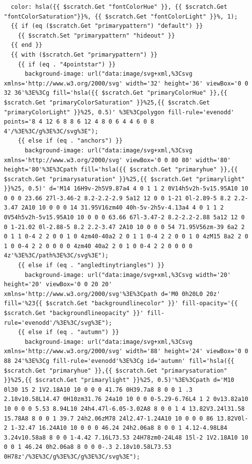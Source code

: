 \documentclass[11pt]{article}
\begin{document}
\begin{enumerate}
\begin{verbatim}
  color: hsla({{ $scratch.Get "fontColorHue" }}, {{ $scratch.Get "fontColorSaturation"}}%, {{ $scratch.Get "fontColorLight" }}%, 1);
  {{ if (eq ($scratch.Get "primarypattern") "default") }}
    {{ $scratch.Set "primarypattern" "hideout" }}
  {{ end }}
  {{ with ($scratch.Get "primarypattern") }}
    {{ if (eq . "4pointstar") }}
      background-image: url("data:image/svg+xml,%3Csvg xmlns='http://www.w3.org/2000/svg' width='32' height='36' viewBox='0 0 32 36'%3E%3Cg fill='hsla({{ $scratch.Get "primaryColorHue" }},{{ $scratch.Get "primaryColorSaturation" }}%25,{{ $scratch.Get "primaryColorLight" }}%25, 0.5)' %3E%3Cpolygon fill-rule='evenodd' points='8 4 12 6 8 8 6 12 4 8 0 6 4 4 6 0 8 4'/%3E%3C/g%3E%3C/svg%3E");
    {{ else if (eq . "anchors") }}
      background-image: url("data:image/svg+xml,%3Csvg xmlns='http://www.w3.org/2000/svg' viewBox='0 0 80 80' width='80' height='80'%3E%3Cpath fill='hsla({{ $scratch.Get "primaryhue" }},{{ $scratch.Get "primarysaturation" }}%25,{{ $scratch.Get "primarylight" }}%25, 0.5)' d='M14 16H9v-2h5V9.87a4 4 0 1 1 2 0V14h5v2h-5v15.95A10 10 0 0 0 23.66 27l-3.46-2 8.2-2.2-2.9 5a12 12 0 0 1-21 0l-2.89-5 8.2 2.2-3.47 2A10 10 0 0 0 14 31.95V16zm40 40h-5v-2h5v-4.13a4 4 0 1 1 2 0V54h5v2h-5v15.95A10 10 0 0 0 63.66 67l-3.47-2 8.2-2.2-2.88 5a12 12 0 0 1-21.02 0l-2.88-5 8.2 2.2-3.47 2A10 10 0 0 0 54 71.95V56zm-39 6a2 2 0 1 1 0-4 2 2 0 0 1 0 4zm40-40a2 2 0 1 1 0-4 2 2 0 0 1 0 4zM15 8a2 2 0 1 0 0-4 2 2 0 0 0 0 4zm40 40a2 2 0 1 0 0-4 2 2 0 0 0 0 4z'%3E%3C/path%3E%3C/svg%3E");
    {{ else if (eq . "angledtinytriangles") }}
      background-image: url("data:image/svg+xml,%3Csvg width='20' height='20' viewBox='0 0 20 20' xmlns='http://www.w3.org/2000/svg'%3E%3Cpath d='M0 0h20L0 20z' fill='%23{{ $scratch.Get "backgroundlinecolor" }}' fill-opacity='{{ $scratch.Get "backgroundlineopacity" }}' fill-rule='evenodd'/%3E%3C/svg%3E");
    {{ else if (eq . "autumn") }}
      background-image: url("data:image/svg+xml,%3Csvg xmlns='http://www.w3.org/2000/svg' width='88' height='24' viewBox='0 0 88 24'%3E%3Cg fill-rule='evenodd'%3E%3Cg id='autumn' fill='hsla({{ $scratch.Get "primaryhue" }},{{ $scratch.Get "primarysaturation" }}%25,{{ $scratch.Get "primarylight" }}%25, 0.5)'%3E%3Cpath d='M10 0l30 15 2 1V2.18A10 10 0 0 0 41.76 0H39.7a8 8 0 0 1 .3 2.18v10.58L14.47 0H10zm31.76 24a10 10 0 0 0-5.29-6.76L4 1 2 0v13.82a10 10 0 0 0 5.53 8.94L10 24h4.47l-6.05-3.02A8 8 0 0 1 4 13.82V3.24l31.58 15.78A8 8 0 0 1 39.7 24h2.06zM78 24l2.47-1.24A10 10 0 0 0 86 13.82V0l-2 1-32.47 16.24A10 10 0 0 0 46.24 24h2.06a8 8 0 0 1 4.12-4.98L84 3.24v10.58a8 8 0 0 1-4.42 7.16L73.53 24H78zm0-24L48 15l-2 1V2.18A10 10 0 0 1 46.24 0h2.06a8 8 0 0 0-.3 2.18v10.58L73.53 0H78z'/%3E%3C/g%3E%3C/g%3E%3C/svg%3E");

\end{verbatim}
\end{enumerate}
\end{document}
